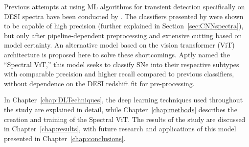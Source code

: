 Previous attempts at using ML algorithms for transient detection specifically on DESI 
spectra have been conducted by \textcite{rubenzahl2018, wasserman2021, Sepeku2022}. The classifiers 
presented by \textcite{wasserman2021, Sepeku2022} were 
shown to be capable of high precision (further explained in Section~\ref{sec:CNNspectra}), 
but only after pipeline-dependent preprocessing and extensive cutting based on model certainty.
An alternative model based on the vision transformer (ViT) architecture is proposed here to 
solve these shortcomings. Aptly named the ``Spectral ViT,'' this model seeks to 
classify SNe into their respective subtypes with comparable precision and higher 
recall compared to previous classifiers, without dependence on the DESI redshift fit for pre-processing. 

In Chapter~\ref{chap:DLTechniques}, the deep learning techniques used throughout the study 
are explained in detail, while Chapter~\ref{chap:methods} describes the creation and training 
of the Spectral ViT. The results of the study are discussed in Chapter~\ref{chap:results}, with 
future research and applications of this model presented in Chapter~\ref{chap:conclusions}. 



